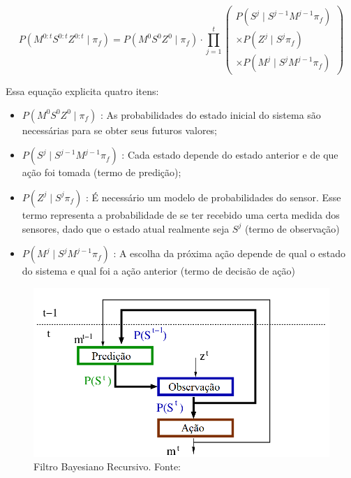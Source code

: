 \begin{equation}
        P ( M^{0: t} S^{0: t} Z^{0: t} \mid \pi_f ) = P ( M^0 S^0 Z^0 \mid \pi_f ) \cdot \prod\limits_{j =1}^{t} 
        \left(
            \begin{array}{l}
                P( S^j \mid S^{j -1} M^{j -1} \pi_f ) \\
                \times P( Z^j \mid S^j \pi_f ) \\
                \times P( M^j \mid S^j M^{j -1} \pi_f )
            \end{array}
        \right)
\end{equation}

Essa equação explicita quatro itens:

\begin{itemize}
  \item $ P \left( M^0 S^0 Z^0 \mid \pi_f \right) $ : As probabilidades do estado inicial do sistema são necessárias para se obter seus futuros valores;
  \item $ P \left( S^j \mid S^{j-1} M^{j-1} \pi_f \right) $ : Cada estado depende do estado anterior e de que ação foi tomada (termo de predição);
  \item $ P \left( Z^j \mid S^j \pi_f \right) $ : É necessário um modelo de probabilidades do sensor. Esse termo representa a probabilidade de se ter recebido uma certa medida dos sensores, dado que o estado atual realmente seja $ S^j $ (termo de observação)
  \item $ P \left( M^j \mid S^j M^{j-1} \pi_f \right) $ : A escolha da próxima ação depende de qual o estado do sistema e qual foi a ação anterior (termo de decisão de ação)
\end{itemize}

\begin{figure}[h]
    \centering
    \includegraphics[width=120mm]{images/modelo_bayesiano-carla}
    \caption{\label{img:ModeloProbabilisticoCarla}Filtro Bayesiano Recursivo. Fonte: \cite{Koike:2005}}
\end{figure}

